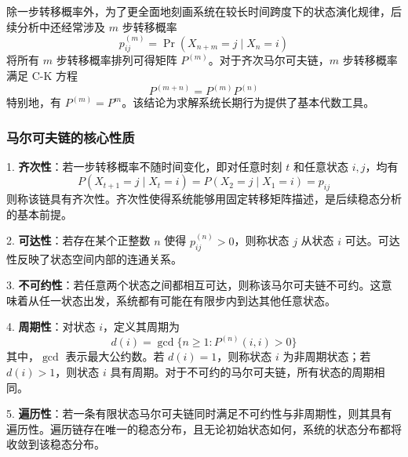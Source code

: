 除一步转移概率外，为了更全面地刻画系统在较长时间跨度下的状态演化规律，后续分析中还经常涉及 $m$ 步转移概率
\begin{equation}
    p_{ij}^{(m)}=\Pr(X_{n+m}=j \mid X_n=i)
\end{equation}
将所有 $m$ 步转移概率排列可得矩阵 $P^{(m)}$。对于齐次马尔可夫链，$m$ 步转移概率满足 C-K 方程
\begin{equation}
    P^{(m+n)}=P^{(m)}P^{(n)}
\end{equation}
特别地，有 $P^{(m)}=P^m$。该结论为求解系统长期行为提供了基本代数工具。

\subsubsection{马尔可夫链的核心性质}

1. \textbf{齐次性}：若一步转移概率不随时间变化，即对任意时刻 $t$ 和任意状态 $i,j$，均有
    \begin{equation}
        P(X_{t+1}=j \mid X_t=i) = P(X_2=j \mid X_1=i) = p_{ij}
    \end{equation}
    则称该链具有齐次性。齐次性使得系统能够用固定转移矩阵描述，是后续稳态分析的基本前提。

2. \textbf{可达性}：若存在某个正整数 $n$ 使得 $p_{ij}^{(n)}>0$，则称状态 $j$ 从状态 $i$ 可达。可达性反映了状态空间内部的连通关系。

3. \textbf{不可约性}：若任意两个状态之间都相互可达，则称该马尔可夫链不可约。这意味着从任一状态出发，系统都有可能在有限步内到达其他任意状态。

4. \textbf{周期性}：对状态 $i$，定义其周期为
    \begin{equation}
        d(i) = \gcd\{n \ge 1 : P^{(n)}(i,i) > 0\}
    \end{equation}
    其中，$\gcd$ 表示最大公约数。若 $d(i)=1$，则称状态 $i$ 为非周期状态；若 $d(i)>1$，则状态 $i$ 具有周期。对于不可约的马尔可夫链，所有状态的周期相同。

5. \textbf{遍历性}：若一条有限状态马尔可夫链同时满足不可约性与非周期性，则其具有遍历性。遍历链存在唯一的稳态分布，且无论初始状态如何，系统的状态分布都将收敛到该稳态分布。

